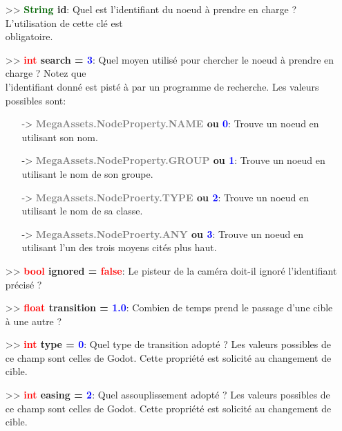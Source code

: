 \documentclass[a4paper, 11pt]{article}
\begin{document}
	\begin{itemize}
		\item[>> \textbf{\textcolor{darkgreen}{String} id}:] Quel est l'identifiant du noeud à prendre en 
		charge ? L'utilisation de cette clé est \\obligatoire.\\
		\item[>> \textbf{\textcolor{red}{int} search = \textcolor{blue}{3}}:] Quel moyen utilisé pour 
		chercher le noeud à prendre en charge ? Notez que \\l'identifiant donné est pisté à par un programme 
		de recherche. Les valeurs possibles sont:
		\begin{itemize}
			\item [-> \textbf{\textcolor{gray}{MegaAssets.NodeProperty.NAME} ou \textcolor{blue}{0}}:] 
				Trouve un noeud en utilisant son nom.
				\item [-> \textbf{\textcolor{gray}{MegaAssets.NodeProperty.GROUP} ou \textcolor{blue}{1}}:] 
				Trouve un noeud en utilisant le nom de son groupe.
				\item [-> \textbf{\textcolor{gray}{MegaAssets.NodeProerty.TYPE} ou \textcolor{blue}{2}}:] 
				Trouve un noeud en utilisant le nom de sa classe.
				\item [-> \textbf{\textcolor{gray}{MegaAssets.NodeProerty.ANY} ou \textcolor{blue}{3}}:] 
				Trouve un noeud en utilisant l'un des trois moyens cités plus haut.\\
		\end{itemize}
		\item[>> \textbf{\textcolor{red}{bool} ignored = \textcolor{red}{false}}:] Le pisteur de la caméra 
		doit-il ignoré l'identifiant précisé ?\\
		\item[>> \textbf{\textcolor{red}{float} transition = \textcolor{blue}{1.0}}:] Combien de temps prend 
		le passage d'une cible à une autre ?\\
		\item[>> \textbf{\textcolor{red}{int} type = \textcolor{blue}{0}}:] Quel type de transition adopté ?
		Les valeurs possibles de ce champ sont celles de Godot. Cette propriété est solicité au changement 
		de cible.\\
		\item[>> \textbf{\textcolor{red}{int} easing = \textcolor{blue}{2}}:] Quel assouplissement adopté ? 
		Les valeurs possibles de ce champ sont celles de Godot. Cette propriété est solicité au changement 
		de cible.\\

\end{itemize}
\end{document}
